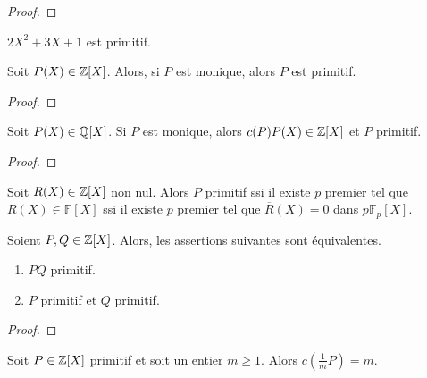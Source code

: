 \ifdefined\outputproof
\begin{proof}

\end{proof}
\fi

\begin{exemple}
	$2 X^{2} + 3 X + 1$ est primitif.
\end{exemple}

\begin{proposition}
	Soit $P(X) \in \mathbb{Z}[X]$. Alors, si $P$ est monique, alors $P$ est
	primitif.
\end{proposition}

\ifdefined\outputproof
\begin{proof}

\end{proof}
\fi

\begin{lemma}
	Soit $P(X) \in \mathbb{Q}[X]$. Si $P$ est monique, alors $c(P) P(X) \in
	\mathbb{Z}[X]$ et $P$ primitif.
\end{lemma}

\ifdefined\outputproof
\begin{proof}

\end{proof}
\fi

\begin{remarque}
	Soit $R(X) \in \mathbb{Z}[X]$ non nul. Alors $P$ primitif ssi il existe $p$
	premier tel que $R(X) \in \mathbb{F}[X]$ ssi il existe $p$ premier tel que
	$\overline{R}(X) = 0$ dans $p \mathbb{F}_{p}[X]$.
\end{remarque}

\begin{lemma}
	Soient $P, Q \in \mathbb{Z}[X]$. Alors, les assertions suivantes sont équivalentes.

	\begin{enumerate}
		\item $PQ$ primitif.
		\item $P$ primitif et $Q$ primitif.
	\end{enumerate}
\end{lemma}

\ifdefined\outputproof
\begin{proof}

\end{proof}
\fi

\begin{lemma}
	Soit $P \in \mathbb{Z}[X]$ primitif et soit un entier $m \geq 1$. Alors
	$c(\frac{1}{m} P) = m$.
\end{lemma}

